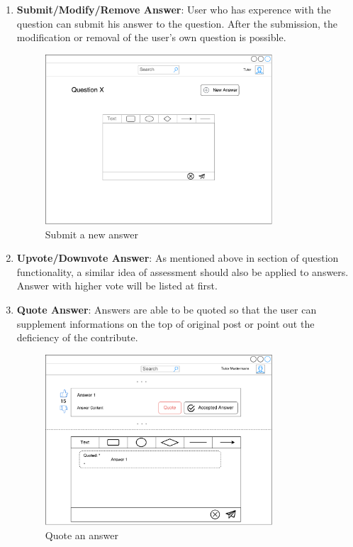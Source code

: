 \begin{enumerate}
\item
\textbf{Submit/Modify/Remove Answer}: User who has experence with the question can submit his answer to the question. After the submission, the modification or removal of the user's own question is possible.

\begin{figure}[!htbp]
  \centering
    \includegraphics[width=0.8\textwidth]{Figures/mockup/New-Answer-modify.pdf}
  \caption{Submit a new answer}
\end{figure}

\item
\textbf{Upvote/Downvote Answer}: As mentioned above in section of question functionality, a similar idea of assessment should also be applied to answers. Answer with higher vote will be listed at first.


\item
\textbf{Quote Answer}: Answers are able to be quoted so that the user can supplement informations on the top of original post or point out the deficiency of the contribute.

\begin{figure}[!htbp]
  \centering
    \includegraphics[width=0.8\textwidth]{Figures/mockup/quote.pdf}
  \caption{Quote an answer}
\end{figure}


\end{enumerate}

